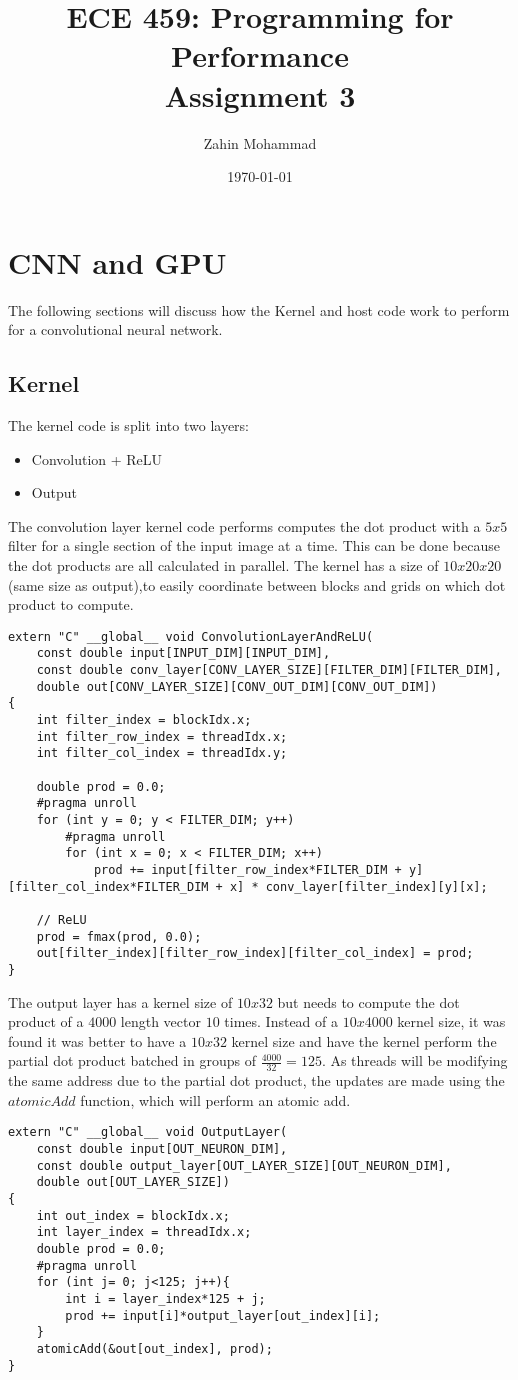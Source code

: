 \documentclass[12pt]{article}
\title{ECE 459: Programming for Performance\\Assignment 3}
\author{Zahin Mohammad}
\date{\today}
\begin{document}
\maketitle

\section{CNN and GPU}
The following sections will discuss how the Kernel and host code work to perform for a convolutional neural network.
\subsection{Kernel}
The kernel code is split into two layers:
\begin{itemize}
    \item Convolution + ReLU
    \item Output
\end{itemize}

The convolution layer kernel code performs computes the dot product with a $5x5$ filter for a single section of the input image at a time. This can be done because the dot products are all calculated in parallel. The kernel has a size of $10x20x20$ (same size as output),to easily coordinate between blocks and grids on which dot product to compute. 
\begin{verbatim}
extern "C" __global__ void ConvolutionLayerAndReLU(
    const double input[INPUT_DIM][INPUT_DIM], 
    const double conv_layer[CONV_LAYER_SIZE][FILTER_DIM][FILTER_DIM], 
    double out[CONV_LAYER_SIZE][CONV_OUT_DIM][CONV_OUT_DIM]) 
{
    int filter_index = blockIdx.x;
    int filter_row_index = threadIdx.x;
    int filter_col_index = threadIdx.y;

    double prod = 0.0;
    #pragma unroll
    for (int y = 0; y < FILTER_DIM; y++)
        #pragma unroll
        for (int x = 0; x < FILTER_DIM; x++)
            prod += input[filter_row_index*FILTER_DIM + y][filter_col_index*FILTER_DIM + x] * conv_layer[filter_index][y][x];

    // ReLU
    prod = fmax(prod, 0.0);
    out[filter_index][filter_row_index][filter_col_index] = prod;
}
\end{verbatim}
The output layer has a kernel size of $10x32$ but needs to compute the dot product of a $4000$ length vector $10$ times. Instead of a $10x4000$ kernel size, it was found it was better to have a $10x32$ kernel size and have the kernel perform the partial dot product batched in groups of $\frac{4000}{32}=125$. As threads will be modifying the same address due to the partial dot product, the updates are made using the $atomicAdd$ function, which will perform an atomic add.
\begin{verbatim}
extern "C" __global__ void OutputLayer(
    const double input[OUT_NEURON_DIM], 
    const double output_layer[OUT_LAYER_SIZE][OUT_NEURON_DIM], 
    double out[OUT_LAYER_SIZE]) 
{
    int out_index = blockIdx.x;
    int layer_index = threadIdx.x;
    double prod = 0.0;
    #pragma unroll
    for (int j= 0; j<125; j++){
        int i = layer_index*125 + j; 
        prod += input[i]*output_layer[out_index][i];
    }
    atomicAdd(&out[out_index], prod);
}
\end{verbatim}
\end{document}
